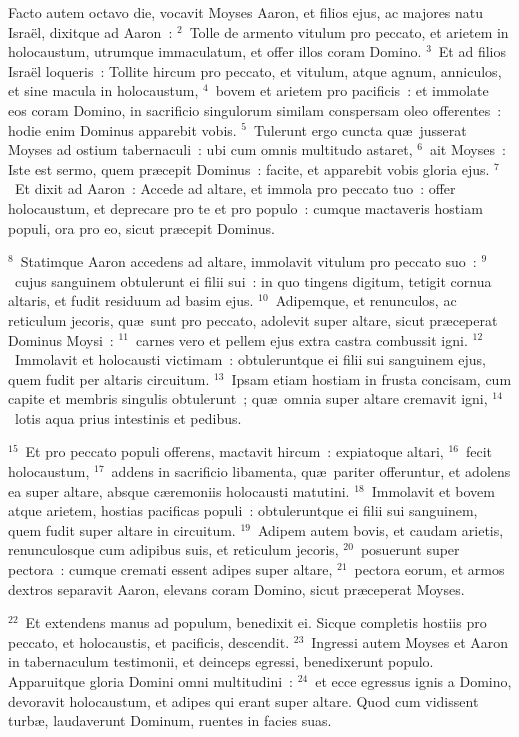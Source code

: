 \lettrine[lines=3,image=true,loversize=0.05,lraise=-0.03]{F}{}acto autem octavo die, vocavit Moyses Aaron, et filios ejus, ac majores natu Isra\"el, dixitque ad Aaron~:
${}^{2}$~Tolle de armento vitulum pro peccato, et arietem in holocaustum, utrumque immaculatum, et offer illos coram Domino.
${}^{3}$~Et ad filios Isra\"el loqueris~: Tollite hircum pro peccato, et vitulum, atque agnum, anniculos, et sine macula in holocaustum,
${}^{4}$~bovem et arietem pro pacificis~: et immolate eos coram Domino, in sacrificio singulorum similam conspersam oleo offerentes~: hodie enim Dominus apparebit vobis.
${}^{5}$~Tulerunt ergo cuncta qu\ae\ jusserat Moyses ad ostium tabernaculi~: ubi cum omnis multitudo astaret,
${}^{6}$~ait Moyses~: Iste est sermo, quem pr\ae cepit Dominus~: facite, et apparebit vobis gloria ejus.
${}^{7}$~Et dixit ad Aaron~: Accede ad altare, et immola pro peccato tuo~: offer holocaustum, et deprecare pro te et pro populo~: cumque mactaveris hostiam populi, ora pro eo, sicut pr\ae cepit Dominus.


${}^{8}$~Statimque Aaron accedens ad altare, immolavit vitulum pro peccato suo~:
${}^{9}$~cujus sanguinem obtulerunt ei filii sui~: in quo tingens digitum, tetigit cornua altaris, et fudit residuum ad basim ejus.
${}^{10}$~Adipemque, et renunculos, ac reticulum jecoris, qu\ae\ sunt pro peccato, adolevit super altare, sicut pr\ae ceperat Dominus Moysi~:
${}^{11}$~carnes vero et pellem ejus extra castra combussit igni.
${}^{12}$~Immolavit et holocausti victimam~: obtuleruntque ei filii sui sanguinem ejus, quem fudit per altaris circuitum.
${}^{13}$~Ipsam etiam hostiam in frusta concisam, cum capite et membris singulis obtulerunt~; qu\ae\ omnia super altare cremavit igni,
${}^{14}$~lotis aqua prius intestinis et pedibus.


${}^{15}$~Et pro peccato populi offerens, mactavit hircum~: expiatoque altari,
${}^{16}$~fecit holocaustum,
${}^{17}$~addens in sacrificio libamenta, qu\ae\ pariter offeruntur, et adolens ea super altare, absque c\ae remoniis holocausti matutini.
${}^{18}$~Immolavit et bovem atque arietem, hostias pacificas populi~: obtuleruntque ei filii sui sanguinem, quem fudit super altare in circuitum.
${}^{19}$~Adipem autem bovis, et caudam arietis, renunculosque cum adipibus suis, et reticulum jecoris,
${}^{20}$~posuerunt super pectora~: cumque cremati essent adipes super altare,
${}^{21}$~pectora eorum, et armos dextros separavit Aaron, elevans coram Domino, sicut pr\ae ceperat Moyses.


${}^{22}$~Et extendens manus ad populum, benedixit ei. Sicque completis hostiis pro peccato, et holocaustis, et pacificis, descendit.
${}^{23}$~Ingressi autem Moyses et Aaron in tabernaculum testimonii, et deinceps egressi, benedixerunt populo. Apparuitque gloria Domini omni multitudini~:
${}^{24}$~et ecce egressus ignis a Domino, devoravit holocaustum, et adipes qui erant super altare. Quod cum vidissent turb\ae , laudaverunt Dominum, ruentes in facies suas.

